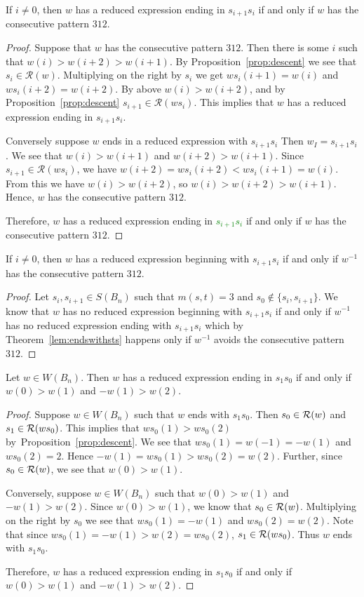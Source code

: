 \begin{lemma}\label{lem:st}
If $i \neq 0$, then $w$ has a reduced expression ending in $s_{i+1}s_i$ if and only if $w$ has the consecutive pattern $312$.
\begin{proof}
	Suppose that $w$ has the consecutive pattern $312$.  Then there is some $i$ such that $w(i)>w(i+2)>w(i+1)$. By Proposition~\ref{prop:descent} we see that $s_i \in \mathcal{R}(w)$. Multiplying on the right by $s_i$ we get $ws_i(i+1)=w(i)$ and $ws_i(i+2)=w(i+2)$. By above $w(i)>w(i+2)$, and by Proposition~\ref{prop:descent} $s_{i+1} \in \mathcal{R}(ws_i)$. This implies that $w$ has a reduced expression ending in $s_{i+1}s_i$. 
	
	Conversely suppose $w$ ends in a reduced expression with $s_{i+1}s_i$ Then $w_I=s_{i+1}s_i$. We see that $w(i)>w(i+1)$ and $w(i+2)>w(i+1)$. Since $s_{i+1} \in \mathcal{R}(ws_i)$, we have $w(i+2)=ws_i(i+2)<ws_i(i+1)=w(i)$. From this we have $w(i)>w(i+2)$, so $w(i)>w(i+2)>w(i+1)$. Hence, $w$ has the consecutive pattern $312$. 
	
	Therefore, $w$ has a reduced expression ending in \textcolor{green}{$s_{i+1}s_i$} if and only if $w$ has the consecutive pattern $312$.
\end{proof}
\end{lemma}

\begin{corollary}\label{lem:endswithts}
	If $i \neq 0$, then $w$ has a reduced expression beginning with $s_{i+1}s_i$ if and only if $w^{-1}$ has the consecutive pattern $312$.
	\begin{proof}
		Let $s_i,s_{i+1} \in S(B_n)$ such that $m(s,t)=3$ and $s_0 \notin\{s_i,s_{i+1}\}$. We know that $w$ has no reduced expression beginning with $s_{i+1}s_i$ if and only if $w^{-1}$ has no reduced expression ending with $s_{i+1}s_i$ which by Theorem~\ref{lem:endswithsts} happens only if $w^{-1}$ avoids the consecutive pattern $312.$
	\end{proof}
\end{corollary}

\begin{lemma}\label{lem:endswiths0}
Let $w \in W(B_n)$. Then $w$ has a reduced expression ending in $s_1s_0$ if and only if $w(0)>w(1)$ and $-w(1)>w(2)$.
\begin{proof}
	Suppose $w \in W(B_n)$ such that $w$ ends with $s_1s_0$. Then $s_0 \in \mathcal{R}(w)$ and $s_1 \in \mathcal{R}(ws_0)$. This implies that $ws_0(1)>ws_0(2)$ by~Proposition~\ref{prop:descent}. We see that $ws_0(1)=w(-1)=-w(1)$ and $ws_0(2)=2$. Hence $-w(1)=ws_0(1)>ws_0(2)=w(2)$. Further, since $s_0 \in \mathcal{R}(w)$, we see that $w(0)>w(1)$.
	
	Conversely, suppose $w \in W(B_n)$ such that $w(0)>w(1)$ and $-w(1)>w(2)$. Since $w(0)>w(1)$, we know that $s_0 \in \mathcal{R}(w)$. Multiplying on the right by $s_0$ we see that $ws_0(1)=-w(1)$ and $ws_0(2)=w(2)$. Note that since $ws_0(1)=-w(1)>w(2)=ws_0(2)$, $s_1 \in \mathcal{R}(ws_0)$. Thus $w$ ends with $s_1s_0$. 
	
	Therefore, $w$ has a reduced expression ending in $s_1s_0$ if and only if $w(0)>w(1)$ and $-w(1)>w(2)$.
\end{proof}
\end{lemma}

